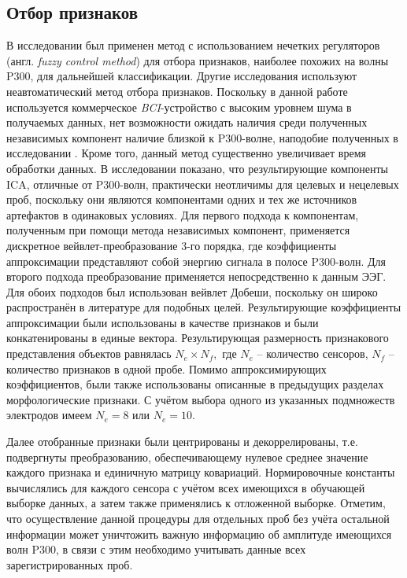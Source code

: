 \documentclass[12pt,a4paper,oneside,fleqn,leqno]{article}
\begin{document}
	\subsection{Отбор признаков}
	\par В исследовании \cite{Piccione} был применен метод с использованием нечетких регуляторов (англ. {\it fuzzy control method}) для отбора признаков, наиболее похожих на волны P300, для дальнейшей классификации. Другие исследования используют неавтоматический метод отбора признаков. Поскольку в данной работе используется коммерческое {\it BCI}-устройство с высоким уровнем шума в получаемых данных, нет возможности ожидать наличия среди полученных независимых компонент наличие близкой к P300-волне, наподобие полученных в исследовании \cite{Piccione}. Кроме того, данный метод существенно увеличивает время обработки данных. В исследовании \cite{James} показано, что результирующие компоненты ICA, отличные от P300-волн, практически неотличимы для целевых и нецелевых проб, поскольку они являются компонентами одних и тех же источников артефактов в одинаковых условиях. Для первого подхода к компонентам, полученным при помощи метода независимых компонент, применяется дискретное вейвлет-преобразование 3-го порядка, где коэффициенты аппроксимации представляют собой  энергию сигнала в полосе P300-волн. Для второго подхода преобразование применяется непосредственно к данным ЭЭГ. Для обоих подходов был использован вейвлет Добеши, поскольку он широко распространён в литературе для подобных целей. Результирующие коэффициенты аппроксимации были использованы в качестве признаков и были конкатенированы в единые вектора. Результирующая размерность признакового представления объектов равнялась $N_e \times N_f,$ где $N_e$ -- количество сенсоров, $N_f$ -- количество признаков в одной пробе. Помимо аппроксимирующих коэффициентов, были также использованы описанные в предыдущих разделах морфологические признаки. С учётом выбора одного из указанных подмножеств электродов имеем $N_e = 8$ или $N_e = 10.$
	\par Далее отобранные признаки были центрированы и декоррелированы, т.е. подвергнуты преобразованию, обеспечивающему нулевое среднее значение каждого признака и единичную матрицу ковариаций. Нормировочные константы вычислялись для каждого сенсора с учётом всех имеющихся в обучающей выборке данных, а затем также применялись к отложенной выборке. Отметим, что осуществление данной процедуры для отдельных проб без учёта остальной информации может уничтожить важную информацию об амплитуде имеющихся волн P300, в связи с этим необходимо учитывать данные всех зарегистрированных проб.
\end{document}
